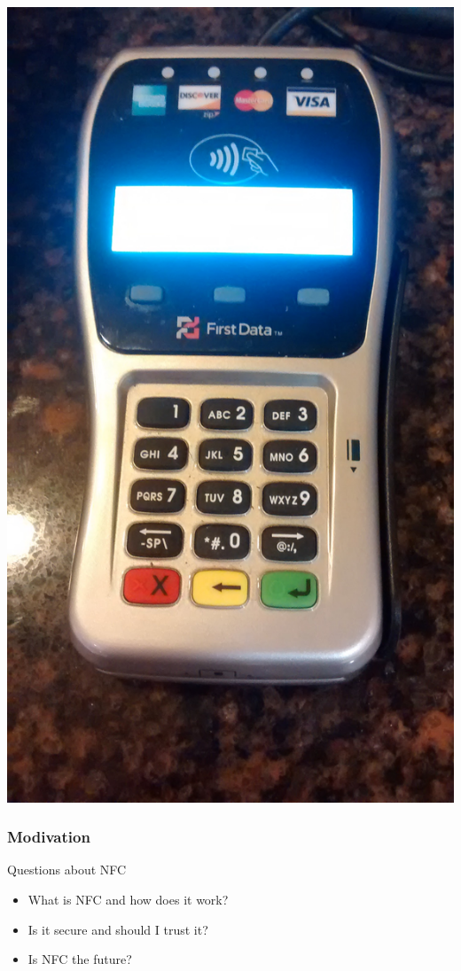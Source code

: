 \documentclass[unknownkeysallowed]{beamer}
\begin{document}
\begin{frame}
\begin{block}{}
\begin{center}
        \includegraphics[width=\linewidth,height=0.3\textheight,keepaspectratio]{figures/higbies.jpg}
      \end{center}
    \end{block}
\end{frame}

\begin{frame}
\frametitle{Modivation}
  \begin{center}
    \begin{minipage}{.7\textwidth}
  	 \begin{block}{Questions about NFC}
        \begin{itemize}
  		    \item{What is NFC and how does it work?}
  		    \item{Is it secure and should I trust it?}
  		    \item{Is NFC the future?}
     		\end{itemize}
     \end{block}
    \end{minipage}
  \end{center}
\end{frame}
\end{document}
